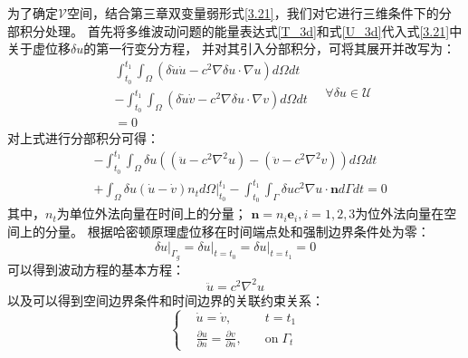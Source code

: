为了确定$\mathcal V$空间，结合第三章双变量弱形式\eqref{3.21}，我们对它进行三维条件下的分部积分处理。
首先将多维波动问题的能量表达式\eqref{T_3d}和式\eqref{U_3d}代入式\eqref{3.21}中关于虚位移$δu$的第一行变分方程，
并对其引入分部积分，可将其展开并改写为：
\begin{equation}
    \begin{aligned}
    &\int_{t_0}^{t_1} \int_{\Omega} (\delta \dot u \dot u - c^2 \nabla \delta u \cdot \nabla u) d\Omega dt \\ 
    &- \int_{t_0}^{t_1} \int_{\Omega} (\delta \dot u \dot v - c^2 \nabla \delta u \cdot \nabla v) d\Omega dt \\ 
    &= 0  
    \end{aligned}
    \quad  \forall \delta u \in \mathcal{U}
\end{equation}
对上式进行分部积分可得：
\begin{equation}
    \begin{aligned}
        & - \int_{t_0}^{t_1} \int_{\Omega} \delta u \left( (\ddot u - c^2 \nabla^2 u) - (\ddot v - c^2 \nabla^2 v) \right) d\Omega dt \\
        & + \int_{\Omega} \delta u (\dot u - \dot v) n_t d\Omega \bigg|_{t_0}^{t_1} 
        - \int_{t_0}^{t_1} \int_{\Gamma} \delta u c^2 \nabla u \cdot \boldsymbol n d\Gamma dt = 0
    \end{aligned}
\end{equation}
其中，$n_t$为单位外法向量在时间上的分量；
$\boldsymbol n = n_i \boldsymbol e_i, i=1,2,3$为位外法向量在空间上的分量。
根据哈密顿原理虚位移在时间端点处和强制边界条件处为零：
\begin{equation}
    \delta u \vert_{\Gamma_g} = \delta u\vert_{t=t_0} = \delta u\vert_{t=t_1} = 0
\end{equation}
可以得到波动方程的基本方程：
\begin{equation}
    \ddot u = c^2 \nabla^2 u
\end{equation}
以及可以得到空间边界条件和时间边界的关联约束关系：
\begin{equation}
    \left \{
        \begin{aligned}
            & \dot u = \dot v,  \quad &t=t_1 \\
            & \frac{\partial u}{\partial n} = \frac{\partial v}{\partial n} , \quad & \text{on} \; \Gamma_t
        \end{aligned}
    \right .
\end{equation}


